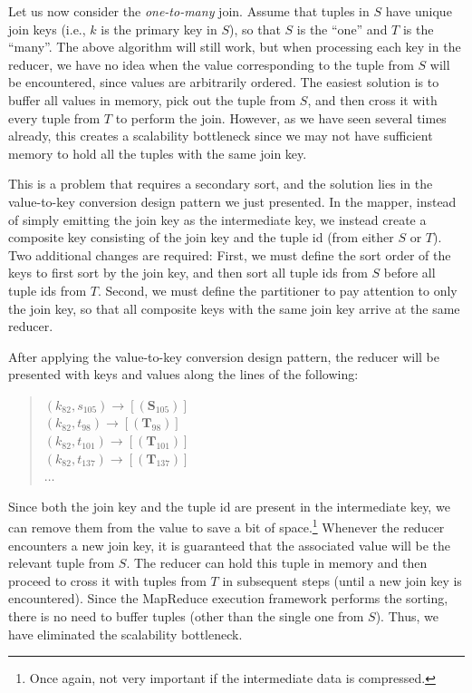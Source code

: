 Let us now consider the \emph{one-to-many} join.  Assume that tuples in
$S$ have unique join keys (i.e., $k$ is the primary key in $S$), so
that $S$ is the ``one'' and $T$ is the ``many''.  The above algorithm
will still work, but when processing each key in the reducer, we have
no idea when the value corresponding to the tuple from $S$ will be
encountered, since values are arbitrarily ordered.  The easiest
solution is to buffer all values in memory, pick out the tuple from
$S$, and then cross it with every tuple from $T$ to perform the join.
However, as we have seen several times already, this creates a
scalability bottleneck since we may not have sufficient memory to hold
all the tuples with the same join key.

This is a problem that requires a secondary sort, and the solution
lies in the value-to-key conversion design pattern we just presented.
In the mapper, instead of simply emitting the join key as the
intermediate key, we instead create a composite key consisting of the
join key and the tuple id (from either $S$ or $T$).  Two additional
changes are required: First, we must define the sort order of the keys
to first sort by the join key, and then sort all tuple ids from $S$
before all tuple ids from $T$.  Second, we must define the
partitioner to pay attention to only the join key, so that all
composite keys with the same join key arrive at the same reducer.

After applying the value-to-key conversion design pattern, the reducer
will be presented with keys and values along the lines of the
following:

\begin{quote}
$(k_{82}, s_{105}) \rightarrow [(\textbf{S}_{105})]$ \\
$(k_{82}, t_{98}) \rightarrow [(\textbf{T}_{98})]$ \\
$(k_{82}, t_{101}) \rightarrow [(\textbf{T}_{101})]$ \\
$(k_{82}, t_{137}) \rightarrow [(\textbf{T}_{137})]$ \\
$\ldots$
\end{quote}

\noindent Since both the join key and the tuple id are present in the
intermediate key, we can remove them from the value to save a bit of
space.\footnote{Once again, not very important if the intermediate
  data is compressed.}  Whenever the reducer encounters a new join
key, it is guaranteed that the associated value will be the relevant
tuple from $S$.  The reducer can hold this tuple in memory and then
proceed to cross it with tuples from $T$ in subsequent steps (until a
new join key is encountered).  Since the MapReduce execution framework
performs the sorting, there is no need to buffer tuples (other than
the single one from $S$).  Thus, we have eliminated the scalability
bottleneck.

